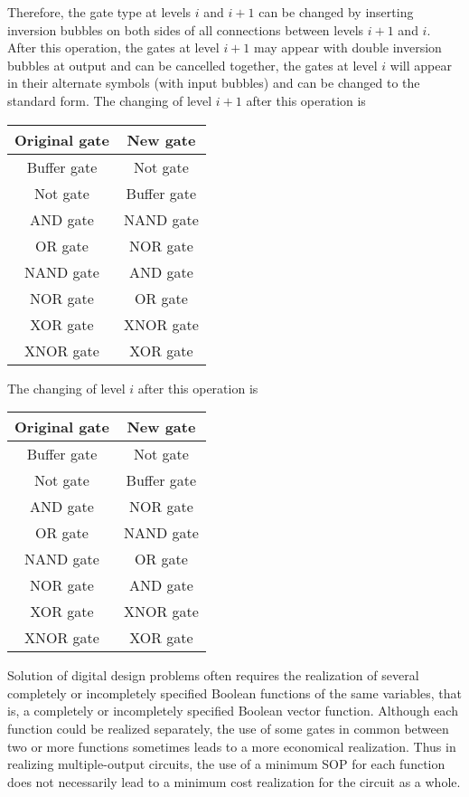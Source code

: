 \documentclass[a4paper,12pt]{article}
\begin{document}
\begin{itemize}
\begin{itemize}
\begin{itemize}
\begin{itemize}
\begin{itemize}
\begin{itemize}
\begin{itemize}
Therefore, the gate type at levels $i$ and $i+1$ can be changed by inserting inversion bubbles on both sides of all connections between levels $i+1$ and $i$. After this operation, the gates at level $i+1$ may appear with double inversion bubbles at output and can be cancelled together, the gates at level $i$ will appear in their alternate symbols (with input bubbles) and can be changed to the standard form. The changing of level $i+1$ after this operation is
\begin{longtable}[c]{|c|c|}
\hline
Original gate & New gate \\\hline\endhead
Buffer gate & Not gate \\\hline
Not gate & Buffer gate \\\hline
AND gate & NAND gate \\\hline
OR gate & NOR gate \\\hline
NAND gate & AND gate \\\hline
NOR gate & OR gate \\\hline
XOR gate & XNOR gate \\\hline
XNOR gate & XOR gate \\\hline
\end{longtable}
The changing of level $i$ after this operation is
\begin{longtable}[c]{|c|c|}
\hline
Original gate & New gate \\\hline\endhead
Buffer gate & Not gate \\\hline
Not gate & Buffer gate \\\hline
AND gate & NOR gate \\\hline
OR gate & NAND gate \\\hline
NAND gate & OR gate \\\hline
NOR gate & AND gate \\\hline
XOR gate & XNOR gate \\\hline
XNOR gate & XOR gate \\\hline
\end{longtable}
Solution of digital design problems often requires the realization of several completely or incompletely specified Boolean functions of the same variables, that is, a completely or incompletely specified Boolean vector function. Although each function could be realized separately, the use of some gates in common between two or more functions sometimes leads to a more economical realization. Thus in realizing multiple-output circuits, the use of a minimum SOP for each function does not necessarily lead to a minimum cost realization for the circuit as a whole.


\end{itemize}
\end{itemize}
\end{itemize}
\end{itemize}
\end{itemize}
\end{itemize}
\end{itemize}
\end{document}

